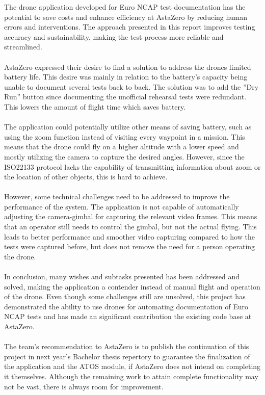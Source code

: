 The drone application developed for Euro NCAP test documentation has the potential to save costs and enhance efficiency at AstaZero by reducing human errors and interventions. The approach presented in this report improves testing accuracy and sustainability, making the test process more reliable and streamlined.
\\ \\
AstaZero expressed their desire to find a solution to address the drones limited battery life. This desire was mainly in relation to the battery's capacity being unable to document several tests back to back. The solution was to add the ''Dry Run'' button since documenting the unofficial rehearsal tests were redundant. This lowers the amount of flight time which saves battery. 
\\ \\
The application could potentially utilize other means of saving battery, such as using the zoom function instead of visiting every waypoint in a mission. This means that the drone could fly on a higher altitude with a lower speed and mostly utilizing the camera to capture the desired angles. However, since the ISO22133 protocol lacks the capability of transmitting information about zoom or the location of other objects, this is hard to achieve.
\\ \\
However, some technical challenges need to be addressed to improve the performance of the system. The application is not capable of automatically adjusting the camera-gimbal for capturing the relevant video frames. This means that an operator still needs to control the gimbal, but not the actual flying. This leads to better performance and smoother video capturing compared to how the tests were captured before, but does not remove the need for a person operating the drone.
\\ \\
In conclusion, many wishes and subtasks presented has been addressed and solved, making the application a contender instead of manual flight and operation of the drone. Even though some challenges still are unsolved, this project has demonstrated the ability to use drones for automating documentation of Euro NCAP tests and has made an significant contribution the existing code base at AstaZero. 
\\ \\
The team's recommendation to AstaZero is to publish the continuation of this project in next year's Bachelor thesis repertory to guarantee the finalization of the application and the ATOS module, if AstaZero does not intend on completing it themselves. Although the remaining work to attain complete functionality may not be vast, there is always room for improvement.